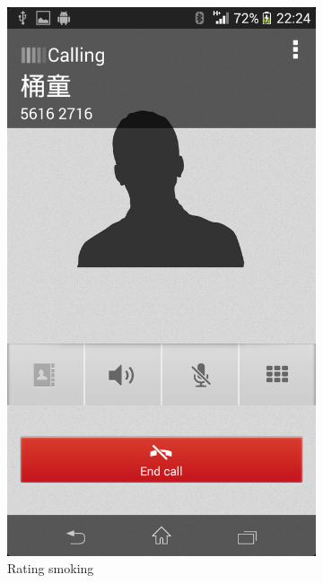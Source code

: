 \begin{figure}
\begin{subfigure}{.24\textwidth}
  \includegraphics[width=.8\linewidth]{img/screenshot/ss6.png}
  \caption{Rating smoking}
\end{subfigure}
\begin{subfigure}{.24\textwidth}
  \centering

\end{subfigure}
\end{figure}

